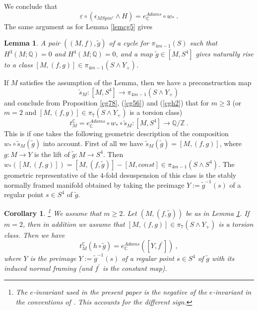 \documentclass[12pt]{article}
\newtheorem{lem}[theorem]{Lemma}
\newtheorem{kor}[theorem]{Corollary}
\newcommand{\Z}{{\mathbb{Z}}}
\newcommand{\Q}{{\mathbb{Q}}}
\newcommand{\C}{{\mathbb{C}}}
\begin{document}
We conclude that
\begin{equation}\label{cg56}\varepsilon\circ (\epsilon_{MSpin^{c}}\wedge H)=e^{Adams}_{\C}\circ w_{*}\ .\end{equation}
The same argument as for Lemma \ref{lemcg5} gives
\begin{lem}\label{lemblav}
A pair $((M,f),\tilde g)$ of  a cycle for $\pi_{4m-1}(S)$ such that 
$H^{3}(M;\Q)=0$ and $H^{4}(M;\Q)=0$,  and a map $\tilde g\in [M,S^{4}]$ gives naturally rise to a class
$[M,(f,g)]\in \pi_{4m-1}(S\wedge Y_{+})$. 
\end{lem}
If $M$ satisfies the assumption of the Lemma, then we have a preconstruction map
$$\tilde s_{M}:[M,S^{4}]\to \pi_{4m-1}(S\wedge Y_{+})$$
and conclude from Proposition \ref{cg78}, (\ref{cg56}) and (\ref{cgh2}) that for $m\ge 3$ (or $m=2$ and $[M,(f,g)]\in \pi_{7}(S\wedge Y_{+})$ is a torsion class) 
$$t_{M}^{\C}=e^{Adams}_{\C}\circ w_{*}\circ \tilde s_{M}:[M,S^{4}]\to \Q/\Z\ .$$
This is \cite[Prop 1.11]{2010arXiv1012.5237C} if one takes the following
geometric description of the composition
$w_{*}\circ \tilde s_{M}(\tilde g)$ into account. First of all we have $\tilde s_{M}(\tilde g)=[M,(f,g)]$,
where $g:M\to Y$ is the lift of $\tilde g:M\to S^{4}$.
Then $w_{*}([M,(f,g)])=[M,(f,\tilde g)]-[M,const]\in \pi_{4m-1}(S\wedge S^{4})$. The geometric representative of the  $4$-fold desuspension
of this class is the stably normally framed manifold obtained by taking the  preimage $Y:=\tilde g^{-1}(s)$
of a regular point $s\in S^{4}$ of $\tilde g$.
\begin{kor}\label{intr2z} \cite[Prop 1.11]{2010arXiv1012.5237C}\footnote{The $e$-invariant used in the present paper is the negative of the $e$-invariant in the conventions of \cite[Prop 1.11]{2010arXiv1012.5237C}. This accounts for the different sign.}
We assume that $m\ge 2$. Let  $(M,(f,\tilde g))$  be as in Lemma \ref{lemblav}. 
If $m=2$, then in addition we assume that $[M,(f,g)]\in \pi_{7}(S\wedge Y_{+})$ is a torsion class.
Then we have
$$t^{\C}_{M}(h\circ \tilde g)=e^{Adams}_{\C}([Y,f^{\prime}])\ ,$$
where $Y$ is the  preimage $Y:=\tilde g^{-1}(s)$
of a regular point $s\in S^{4}$ of $\tilde g$ with its induced normal framing (and $f^{\prime}$ is the constant map).
\end{kor}
\end{document}

